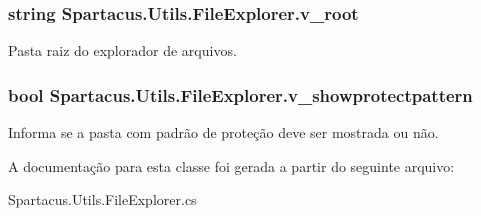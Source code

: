 \hypertarget{classSpartacus_1_1Utils_1_1FileExplorer_a398279cbdbce816d3c0d40b3dc02eb50}{
\subsubsection[{v\+\_\+root}]{\setlength{\rightskip}{0pt plus 5cm}string Spartacus.\+Utils.\+File\+Explorer.\+v\+\_\+root}}\label{classSpartacus_1_1Utils_1_1FileExplorer_a398279cbdbce816d3c0d40b3dc02eb50}


Pasta raiz do explorador de arquivos. 

\hypertarget{classSpartacus_1_1Utils_1_1FileExplorer_adba2289bce9aadfdbb353f811fa0411c}{
\subsubsection[{v\+\_\+showprotectpattern}]{\setlength{\rightskip}{0pt plus 5cm}bool Spartacus.\+Utils.\+File\+Explorer.\+v\+\_\+showprotectpattern}}\label{classSpartacus_1_1Utils_1_1FileExplorer_adba2289bce9aadfdbb353f811fa0411c}


Informa se a pasta com padrão de proteção deve ser mostrada ou não. 



A documentação para esta classe foi gerada a partir do seguinte arquivo\+:\begin{DoxyCompactItemize}
\item 
Spartacus.\+Utils.\+File\+Explorer.\+cs\end{DoxyCompactItemize}
